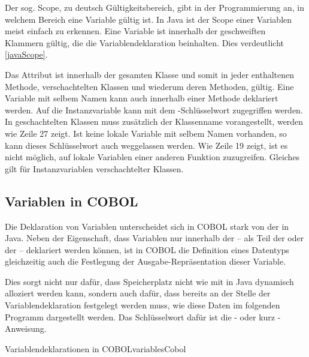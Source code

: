 Der sog. Scope, zu deutsch Gültigkeitsbereich, gibt in der Programmierung an, in welchem Bereich eine Variable gültig ist. In Java ist der Scope einer Variablen meist einfach zu erkennen. Eine Variable ist innerhalb der geschweiften Klammern gültig, die die Variablendeklaration beinhalten. Dies verdeutlicht \autoref{javaScope}.

Das Attribut  ist innerhalb der gesamten Klasse  und somit in jeder enthaltenen Methode, verschachtelten Klassen und wiederum deren Methoden, gültig. Eine Variable mit selbem Namen kann auch innerhalb einer Methode deklariert werden. Auf die Instanzvariable kann mit dem -Schlüsselwort zugegriffen werden. In geschachtelten Klassen muss zusätzlich der Klassenname vorangestellt, werden wie Zeile 27 zeigt. Ist keine lokale Variable mit selbem Namen vorhanden, so kann dieses Schlüsselwort auch weggelassen werden. Wie Zeile 19 zeigt, ist es nicht möglich, auf lokale Variablen einer anderen Funktion zuzugreifen. Gleiches gilt für Instanzvariablen verschachtelter Klassen.


\subsection*{Variablen in COBOL}
Die Deklaration von Variablen unterscheidet sich in COBOL stark von der in Java. Neben der Eigenschaft, dass Variablen nur innerhalb der  -- als Teil der  oder der  -- deklariert werden können, ist in COBOL die Definition eines Datentyps gleichzeitig auch die Festlegung der Ausgabe-Repräsentation dieser Variable. 

Dies sorgt nicht nur dafür, dass Speicherplatz nicht wie mit  in Java dynamisch alloziert werden kann, sondern auch dafür, dass bereits an der Stelle der Variablendeklaration festgelegt werden muss, wie diese Daten im folgenden Programm dargestellt werden. Das Schlüsselwort dafür ist die - oder kurz -Anweisung.

\begin{codeWithCaption}{Variablendeklarationen in COBOL}{variablesCobol}
\end{codeWithCaption}

